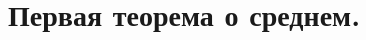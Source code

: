 \documentclass[../main.tex]{subfiles}
\begin{document}
\newpage
\section{Первая теорема о среднем.}
\end{document}
